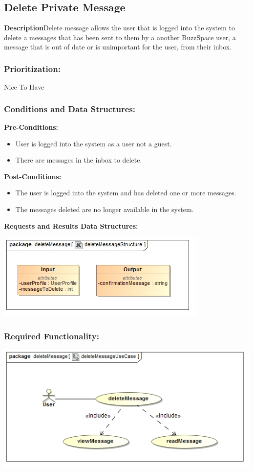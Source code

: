 \documentclass[a4paper,11pt]{article}
\begin{document}
\subsection{Delete Private Message}
\textbf{Description}Delete message allows the user that is logged into the system to delete a messages that has been sent to them by a another BuzzSpace user, a message that is out of date or is unimportant for the user, from their inbox.
\subsubsection{Prioritization:} 
\textbf{}Nice To Have
\subsubsection{Conditions and Data Structures:}
\textbf{Pre-Conditions:}
\begin{itemize}
\item User is logged into the system as a user not a guest. 
\item There are messages in the inbox to delete.
\end{itemize}
\textbf{Post-Conditions:}
\begin{itemize}
\item The user is logged into the system and has deleted one or more messages.
\item The messages deleted are no longer available in the system.
\end{itemize}
\textbf{Requests and Results Data Structures:}
\begin{center}
\includegraphics[width=1\linewidth]{./Images/PrivateMessage/deleteMessageStructure}
\end{center}
\subsubsection{Required Functionality:} 
\includegraphics[width=1\linewidth]{./Images/PrivateMessage/deleteMessageUseCase}
\end{document}
